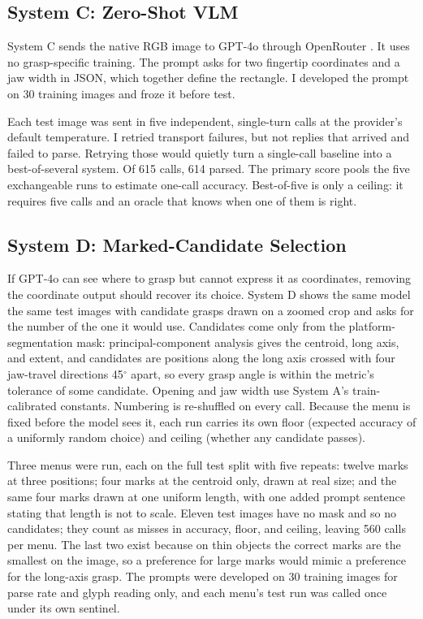 \documentclass[10pt,conference,compsoc]{IEEEtran}
\begin{document}
\subsection{System C: Zero-Shot VLM}

System C sends the native RGB image to GPT-4o through OpenRouter
\cite{openai2024}. It uses no grasp-specific training. The prompt asks for two
fingertip coordinates and a jaw width in JSON, which together define the
rectangle. I developed the prompt on 30 training images and froze it before
test.

Each test image was sent in five independent, single-turn calls at the
provider's default temperature. I retried transport failures, but not replies
that arrived and failed to parse. Retrying those would quietly turn a
single-call baseline into a best-of-several system. Of 615 calls, 614 parsed.
The primary score pools the five exchangeable runs to estimate one-call
accuracy. Best-of-five is only a ceiling: it requires five calls and an oracle
that knows when one of them is right.

\subsection{System D: Marked-Candidate Selection}

If GPT-4o can see where to grasp but cannot express it as coordinates,
removing the coordinate output should recover its choice. System D shows the
same model the same test images with candidate grasps drawn on a zoomed crop
and asks for the number of the one it would use. Candidates come only from
the platform-segmentation mask: principal-component analysis gives the
centroid, long axis, and extent, and candidates are positions along the long
axis crossed with four jaw-travel directions 45$^\circ$ apart, so every grasp
angle is within the metric's tolerance of some candidate. Opening and jaw
width use System A's train-calibrated constants. Numbering is re-shuffled on
every call. Because the menu is fixed before the model sees it, each run
carries its own floor (expected accuracy of a uniformly random choice) and
ceiling (whether any candidate passes).

Three menus were run, each on the full test split with five repeats: twelve
marks at three positions; four marks at the centroid only, drawn at real
size; and the same four marks drawn at one uniform length, with one added
prompt sentence stating that length is not to scale. Eleven test images have
no mask and so no candidates; they count as misses in accuracy, floor, and
ceiling, leaving 560 calls per menu. The last two exist because on thin
objects the correct marks are the smallest on the image, so a preference for
large marks would mimic a preference for the long-axis grasp. The prompts were
developed on 30 training images for parse rate and glyph reading only, and
each menu's test run was called once under its own sentinel.
\end{document}
